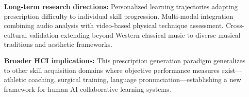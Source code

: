 \textbf{Long-term research directions:} Personalized learning trajectories adapting prescription difficulty to individual skill progression. Multi-modal integration combining audio analysis with video-based physical technique assessment. Cross-cultural validation extending beyond Western classical music to diverse musical traditions and aesthetic frameworks.

\textbf{Broader HCI implications:} This prescription generation paradigm generalizes to other skill acquisition domains where objective performance measures exist—athletic coaching, surgical training, language pronunciation—establishing a new framework for human-AI collaborative learning systems.